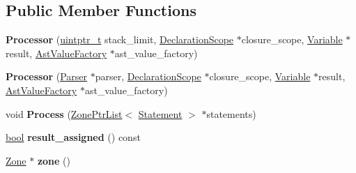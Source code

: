 \subsection*{Public Member Functions}
\begin{DoxyCompactItemize}
\item 
\mbox{\label{classv8_1_1internal_1_1Processor_a95929895fdfeb1d370150acf8f386b31}} 
{\bfseries Processor} (\mbox{\hyperlink{classuintptr__t}{uintptr\+\_\+t}} stack\+\_\+limit, \mbox{\hyperlink{classv8_1_1internal_1_1DeclarationScope}{Declaration\+Scope}} $\ast$closure\+\_\+scope, \mbox{\hyperlink{classv8_1_1internal_1_1Variable}{Variable}} $\ast$result, \mbox{\hyperlink{classv8_1_1internal_1_1AstValueFactory}{Ast\+Value\+Factory}} $\ast$ast\+\_\+value\+\_\+factory)
\item 
\mbox{\label{classv8_1_1internal_1_1Processor_a283eeb3dbfd6af7b883820411761bcfe}} 
{\bfseries Processor} (\mbox{\hyperlink{classv8_1_1internal_1_1Parser}{Parser}} $\ast$parser, \mbox{\hyperlink{classv8_1_1internal_1_1DeclarationScope}{Declaration\+Scope}} $\ast$closure\+\_\+scope, \mbox{\hyperlink{classv8_1_1internal_1_1Variable}{Variable}} $\ast$result, \mbox{\hyperlink{classv8_1_1internal_1_1AstValueFactory}{Ast\+Value\+Factory}} $\ast$ast\+\_\+value\+\_\+factory)
\item 
\mbox{\label{classv8_1_1internal_1_1Processor_a914a4d3ed95bba3d1481b8e38b45a5b0}} 
void {\bfseries Process} (\mbox{\hyperlink{classv8_1_1internal_1_1ZoneList}{Zone\+Ptr\+List}}$<$ \mbox{\hyperlink{classv8_1_1internal_1_1Statement}{Statement}} $>$ $\ast$statements)
\item 
\mbox{\label{classv8_1_1internal_1_1Processor_aed8292e692c8dfc0915c862d35fe0b9e}} 
\mbox{\hyperlink{classbool}{bool}} {\bfseries result\+\_\+assigned} () const
\item 
\mbox{\label{classv8_1_1internal_1_1Processor_ae0d85fa136ee8369529b7c9e4f26be62}} 
\mbox{\hyperlink{classv8_1_1internal_1_1Zone}{Zone}} $\ast$ {\bfseries zone} ()
\item 
\mbox{\label{classv8_1_1internal_1_1Processor_a6cb8532277e6005f455ef076c185ce33}} 

\end{DoxyCompactItemize}
